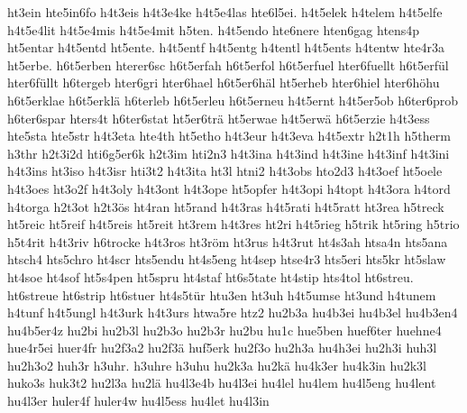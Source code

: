 {    ht3ein
    hte5in6fo
    h4t3eis
    h4t3e4ke
    h4t5e4las
    hte6l5ei.
    h4t5elek
    h4telem
    h4t5elfe
    h4t5e4lit
    h4t5e4mis
    h4t5e4mit
    h5ten.
    h4t5endo
    hte6nere
    hten6gag
    htens4p
    ht5entar
    h4t5entd
    ht5ente.
    h4t5entf
    h4t5entg
    h4tentl
    h4t5ents
    h4tentw
    hte4r3a
    ht5erbe.
    h6t5erben
    hterer6sc
    h6t5erfah
    h6t5erfol
    h6t5erfuel
    hter6fuellt
    h6t5erfül
    hter6füllt
    h6tergeb
    hter6gri
    hter6hael
    h6t5er6häl
    ht5erheb
    hter6hiel
    hter6höhu
    h6t5erklae
    h6t5erklä
    h6terleb
    h6t5erleu
    h6t5erneu
    h4t5ernt
    h4t5er5ob
    h6ter6prob
    h6ter6spar
    hters4t
    h6ter6stat
    ht5er6trä
    ht5erwae
    h4t5erwä
    h6t5erzie
    h4t3ess
    hte5sta
    hte5str
    h4t3eta
    hte4th
    ht5etho
    h4t3eur
    h4t3eva
    h4t5extr
    h2t1h
    h5therm
    h3thr
    h2t3i2d
    hti6g5er6k
    h2t3im
    hti2n3
    h4t3ina
    h4t3ind
    h4t3ine
    h4t3inf
    h4t3ini
    h4t3ins
    ht3iso
    h4t3isr
    hti3t2
    h4t3ita
    ht3l
    htni2
    h4t3obs
    hto2d3
    h4t3oef
    ht5oele
    h4t3oes
    ht3o2f
    h4t3oly
    h4t3ont
    h4t3ope
    ht5opfer
    h4t3opi
    h4topt
    h4t3ora
    h4tord
    h4torga
    h2t3ot
    h2t3ös
    ht4ran
    ht5rand
    h4t3ras
    h4t5rati
    h4t5ratt
    ht3rea
    h5treck
    ht5reic
    ht5reif
    h4t5reis
    ht5reit
    ht3rem
    h4t3res
    ht2ri
    h4t5rieg
    h5trik
    ht5ring
    h5trio
    h5t4rit
    h4t3riv
    h6trocke
    h4t3ros
    ht3röm
    ht3rus
    h4t3rut
    ht4s3ah
    htsa4n
    hts5ana
    htsch4
    hts5chro
    ht4scr
    hts5endu
    ht4s5eng
    ht4sep
    htse4r3
    hts5eri
    hts5kr
    ht5slaw
    ht4soe
    ht4sof
    ht5s4pen
    ht5spru
    ht4staf
    ht6s5tate
    ht4stip
    hts4tol
    ht6streu.
    ht6streue
    ht6strip
    ht6stuer
    ht4s5tür
    htu3en
    ht3uh
    h4t5umse
    ht3und
    h4tunem
    h4tunf
    h4t5ungl
    h4t3urk
    h4t3urs
    htwa5re
    htz2
    hu2b3a
    hu4b3ei
    hu4b3el
    hu4b3en4
    hu4b5er4z
    hu2bi
    hu2b3l
    hu2b3o
    hu2b3r
    hu2bu
    hu1c
    hue5ben
    huef6ter
    huehne4
    hue4r5ei
    huer4fr
    hu2f3a2
    hu2f3ä
    huf5erk
    hu2f3o
    hu2h3a
    hu4h3ei
    hu2h3i
    huh3l
    hu2h3o2
    huh3r
    h3uhr.
    h3uhre
    h3uhu
    hu2k3a
    hu2kä
    hu4k3er
    hu4k3in
    hu2k3l
    huko3s
    huk3t2
    hu2l3a
    hu2lä
    hu4l3e4b
    hu4l3ei
    hu4lel
    hu4lem
    hu4l5eng
    hu4lent
    hu4l3er
    huler4f
    huler4w
    hu4l5ess
    hu4let
    hu4l3in
}
